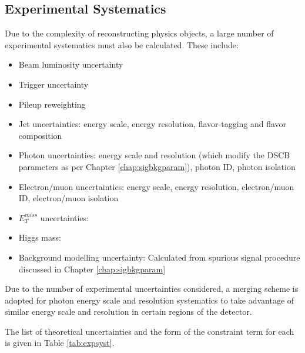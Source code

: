 \subsection{Experimental Systematics}

Due to the complexity of reconstructing physics objects, a large number of experimental systematics must also be calculated.
These include:

\begin{itemize}
\item Beam luminosity uncertainty \cite{ATLAS-CONF-2019-021}
\item Trigger uncertainty \cite{trigger} \cite{triggerperformance}
\item Pileup reweighting
\item Jet uncertainties: energy scale, energy resolution,  flavor-tagging and flavor composition \cite{jetuncs1} \cite{jetuncs2} \cite{jetuncs3} \cite{jetuncs4}
\item Photon uncertainties: energy scale and resolution (which modify the DSCB parameters as per Chapter \ref{chap:sigbkgparam}), photon ID, photon isolation \cite{CERN-EP-2019-145} \cite{photuncs}
\item Electron/muon uncertainties: energy scale, energy resolution, electron/muon ID, electron/muon isolation \cite{CERN-EP-2019-145} \cite{photuncs} \cite{elID-CERN-EP-2018-273} \cite{CERN-EP-2016-033}
\item $E_T^{miss}$ uncertainties: \cite{MET1} \cite{MET2}
\item Higgs mass: \cite{Higgsmass}
\item Background modelling uncertainty: Calculated from spurious signal procedure discussed in Chapter \ref{chap:sigbkgparam}
\end{itemize}

Due to the number of experimental uncertainties considered, a merging scheme is adopted for photon energy scale and resolution systematics to take advantage of similar energy scale and resolution in certain regions of the detector.

The list of theoretical uncertainties and the form of the constraint term for each is given in Table \ref{tab:expsyst}.


